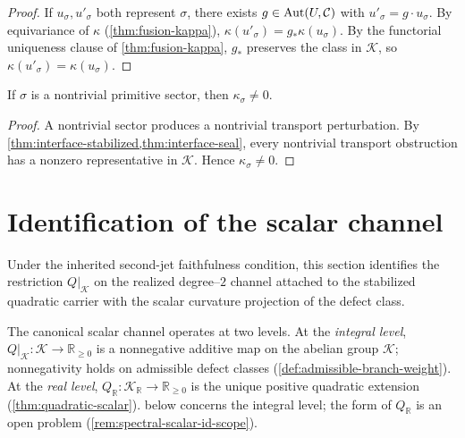 \begin{proof}
If $u_\sigma, u'_\sigma$ both represent $\sigma$, there exists
$g \in \operatorname{Aut}(U,\mathcal C)$ with $u'_\sigma = g \cdot u_\sigma$.
By equivariance of $\kappa$ (\cref{thm:fusion-kappa}),
$\kappa(u'_\sigma) = g_* \kappa(u_\sigma)$.
By the functorial uniqueness clause of \cref{thm:fusion-kappa},
$g_*$ preserves the class in $\mathcal K$, so
$\kappa(u'_\sigma) = \kappa(u_\sigma)$.
\end{proof}

\begin{lemma}
\label{lem:spectral-defect-nonzero}
If $\sigma$ is a nontrivial primitive sector, then $\kappa_\sigma \neq 0$.
\end{lemma}

\begin{proof}
A nontrivial sector produces a nontrivial transport perturbation.
By \cref{thm:interface-stabilized,thm:interface-seal}, every nontrivial
transport obstruction has a nonzero representative in $\mathcal K$.
Hence $\kappa_\sigma \neq 0$.
\end{proof}

\section{Identification of the scalar channel}
\label{sec:spectral-scalar-id}

Under the inherited second-jet faithfulness condition, this section
identifies the restriction $Q|_{\mathcal K}$ on the realized
degree--\(2\) channel attached to the stabilized quadratic carrier
with the scalar curvature projection of the defect class.

\begin{remark}
\label{rem:two-levels-Q}
The canonical scalar channel operates at two levels.
At the \emph{integral level}, $Q|_{\mathcal K} : \mathcal K \to
\mathbb R_{\geq 0}$ is a nonneg\-ative additive map on the abelian group
$\mathcal K$; nonneg\-ativity holds on admissible defect classes
(\cref{def:admissible-branch-weight}).
At the \emph{real level}, $Q_{\mathbb R} : \mathcal K_{\mathbb R} \to
\mathbb R_{\geq 0}$ is the unique positive quadratic extension
(\cref{thm:quadratic-scalar}).
 below concerns the integral
level; the form of $Q_{\mathbb R}$ is an open problem
(\cref{rem:spectral-scalar-id-scope}).
\end{remark}

